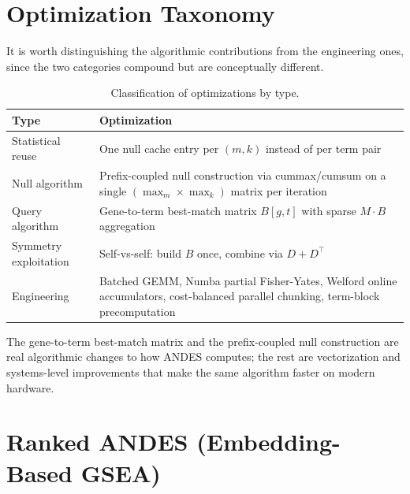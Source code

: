 \documentclass[11pt,a4paper]{article}
\begin{document}
\section{Optimization Taxonomy}

It is worth distinguishing the algorithmic contributions from the engineering
ones, since the two categories compound but are conceptually different.

\begin{table}[H]
	\centering
	\caption{Classification of optimizations by type.}
	\smallskip
	\small
	\begin{tabularx}{\textwidth}{@{}lX@{}}
		\toprule
		Type                  & Optimization                                              \\
		\midrule
		Statistical reuse     & One null cache entry per $(m,k)$ instead of per term pair \\[2pt]
		Null algorithm        & Prefix-coupled null construction via cummax/cumsum on a
		single $(\max_m \times \max_k)$ matrix per iteration                              \\[2pt]
		Query algorithm       & Gene-to-term best-match matrix $B[g,t]$ with sparse
		$M \cdot B$ aggregation                                                           \\[2pt]
		Symmetry exploitation & Self-vs-self: build $B$ once, combine via
		$D + D^\top$                                                                      \\[2pt]
		Engineering           & Batched GEMM, Numba partial Fisher-Yates, Welford online
		accumulators, cost-balanced parallel chunking, term-block precomputation          \\
		\bottomrule
	\end{tabularx}
\end{table}

The gene-to-term best-match matrix and the prefix-coupled null construction
are real algorithmic changes to how ANDES computes; the rest are
vectorization and systems-level improvements that make the same algorithm
faster on modern hardware.

\section{Ranked ANDES (Embedding-Based GSEA)}
\end{document}
